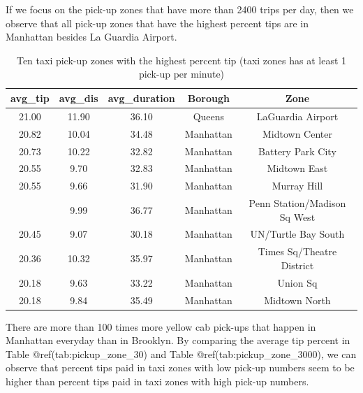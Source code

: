 \documentclass[12pt,twoside]{reedthesis}
\newenvironment{Shaded}{\begin{snugshade}}{\end{snugshade}}
\newcommand{\KeywordTok}[1]{\textcolor[rgb]{0.13,0.29,0.53}{\textbf{#1}}}
\newcommand{\DecValTok}[1]{\textcolor[rgb]{0.00,0.00,0.81}{#1}}
\newcommand{\StringTok}[1]{\textcolor[rgb]{0.31,0.60,0.02}{#1}}
\newcommand{\OperatorTok}[1]{\textcolor[rgb]{0.81,0.36,0.00}{\textbf{#1}}}
\newcommand{\NormalTok}[1]{#1}
\theoremstyle{definition}
\theoremstyle{definition}
\theoremstyle{definition}
\theoremstyle{remark}
\begin{document}
If we focus on the pick-up zones that have more than 2400 trips per day,
then we observe that all pick-up zones that have the highest percent
tips are in Manhattan besides La Guardia Airport.
\begin{Shaded}
\end{Shaded}
\begin{table}

\caption{\label{tab:unnamed-chunk-50}Ten taxi pick-up zones with the highest percent tip (taxi zones has at least 1 pick-up per minute)}
\centering
\begin{tabular}[t]{ccccc}
\toprule
avg\_tip & avg\_dis & avg\_duration & Borough & Zone\\
\midrule
21.00 & 11.90 & 36.10 & Queens & LaGuardia Airport\\
20.82 & 10.04 & 34.48 & Manhattan & Midtown Center\\
20.73 & 10.22 & 32.82 & Manhattan & Battery Park City\\
20.55 & 9.70 & 32.83 & Manhattan & Midtown East\\
20.55 & 9.66 & 31.90 & Manhattan & Murray Hill\\
\addlinespace
20.55 & 9.99 & 36.77 & Manhattan & Penn Station/Madison Sq West\\
20.45 & 9.07 & 30.18 & Manhattan & UN/Turtle Bay South\\
20.36 & 10.32 & 35.97 & Manhattan & Times Sq/Theatre District\\
20.18 & 9.63 & 33.22 & Manhattan & Union Sq\\
20.18 & 9.84 & 35.49 & Manhattan & Midtown North\\
\bottomrule
\end{tabular}
\end{table}
There are more than 100 times more yellow cab pick-ups that happen in
Manhattan everyday than in Brooklyn. By comparing the average tip
percent in Table @ref(tab:pickup\_zone\_30) and Table
@ref(tab:pickup\_zone\_3000), we can observe that percent tips paid in
taxi zones with low pick-up numbers seem to be higher than percent tips
paid in taxi zones with high pick-up numbers.
\end{document}
